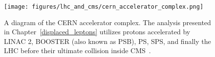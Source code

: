 \begin{figure}
\centering
\texttt{[image: figures/lhc\_and\_cms/cern\_accelerator\_complex.png]}
\caption{A diagram of the CERN accelerator complex. The analysis presented in Chapter~\ref{displaced_leptons} utilizes protons accelerated by LINAC 2, BOOSTER (also known as PSB), PS, SPS, and finally the LHC before their ultimate collision inside CMS~\cite{cern_accelerator_complex}.}
\label{cern_accelerator_complex}
\end{figure}